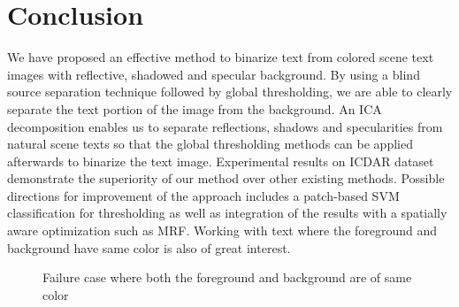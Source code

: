 



\section{Conclusion}
We have proposed an effective method to binarize text from colored scene text images with reflective, shadowed and specular
background. By using a blind source separation technique followed by global thresholding, we are able to clearly separate
the text portion of the image from the background. An ICA decomposition enables us to separate reflections, shadows and 
specularities from natural scene texts so that the global thresholding methods can be applied afterwards to binarize the 
text image. Experimental results on ICDAR dataset demonstrate the superiority of our method over other existing methods. 
Possible directions for improvement of the approach includes a patch-based SVM classification for thresholding as well
as integration of the results with a spatially aware optimization such as MRF. Working with text where the foreground and
background have same color is also of great interest.

\begin{figure}[t]
\centering
{}
\caption
{Failure case where both the foreground and background are of same color}
\label{fig:8}
\end{figure}
